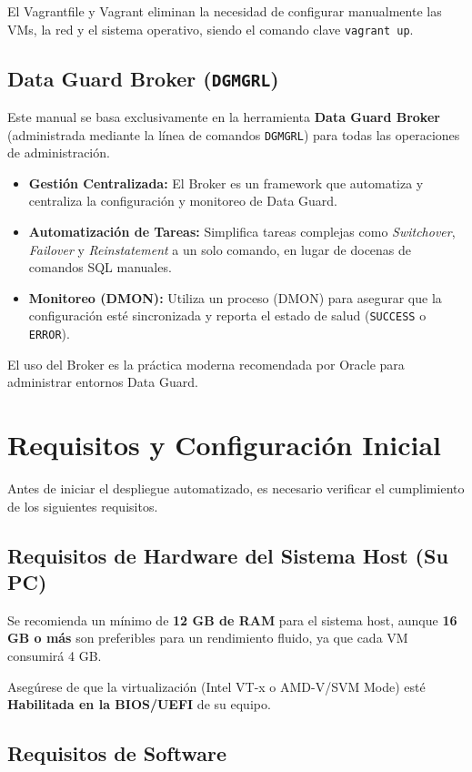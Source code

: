 \documentclass[11pt, a4paper]{report}
\begin{document}
El Vagrantfile y Vagrant eliminan la necesidad de configurar manualmente las VMs, la red y el sistema operativo, siendo el comando clave \texttt{vagrant up}.

\subsection{Data Guard Broker (\texttt{DGMGRL})}
Este manual se basa exclusivamente en la herramienta \textbf{Data Guard Broker} (administrada mediante la línea de comandos \texttt{DGMGRL}) para todas las operaciones de administración.

\begin{itemize}
    \item \textbf{Gestión Centralizada:} El Broker es un framework que automatiza y centraliza la configuración y monitoreo de Data Guard.
    \item \textbf{Automatización de Tareas:} Simplifica tareas complejas como \textit{Switchover}, \textit{Failover} y \textit{Reinstatement} a un solo comando, en lugar de docenas de comandos SQL manuales.
    \item \textbf{Monitoreo (DMON):} Utiliza un proceso (DMON) para asegurar que la configuración esté sincronizada y reporta el estado de salud (\texttt{SUCCESS} o \texttt{ERROR}).
\end{itemize}
El uso del Broker es la práctica moderna recomendada por Oracle para administrar entornos Data Guard.

\section{Requisitos y Configuración Inicial}

Antes de iniciar el despliegue automatizado, es necesario verificar el cumplimiento de los siguientes requisitos.
\subsection{Requisitos de Hardware del Sistema Host (Su PC)}

Se recomienda un mínimo de \textbf{12 GB de RAM} para el sistema host, aunque \textbf{16 GB o más} son preferibles para un rendimiento fluido, ya que cada VM consumirá 4 GB.

Asegúrese de que la virtualización (Intel VT-x o AMD-V/SVM Mode) esté \textbf{Habilitada en la BIOS/UEFI} de su equipo.

\subsection{Requisitos de Software}
\end{document}

